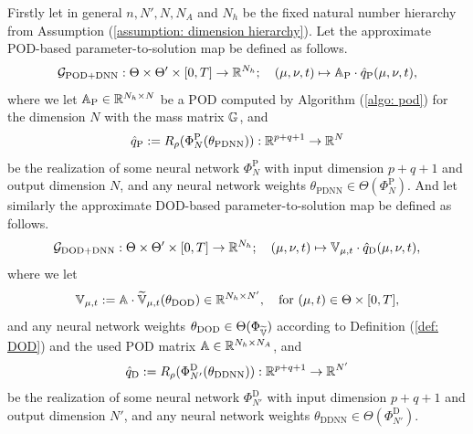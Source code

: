 Firstly let in general $n, N', N, N_A$ and $N_h$ be the fixed natural number hierarchy from 
Assumption (\ref{assumption: dimension hierarchy}). 
Let the approximate POD-based parameter-to-solution map be defined as follows.
\begin{equation*}
    \mathcal{G}_\text{POD+DNN}: \Theta \times \Theta' \times [0, T] \to \mathbb{R}^{N_h}; \quad (\mu, \nu, t) \mapsto 
    \mathbb{A}_\text{P} \cdot \hat{q}_\text{P}(\mu, \nu, t),
\end{equation*}
where we let $\mathbb{A}_\text{P} \in \mathbb{R}^{N_h \times N}$ be a POD computed by Algorithm (\ref{algo: pod}) for the dimension $N$ 
with the mass matrix $\mathbb{G}$,
and
\begin{equation*}
    \hat{q}_\text{P} := R_\rho(\Phi^\text{P}_N(\theta_\text{PDNN})) : \mathbb{R}^{p+q+1} \to \mathbb{R}^N
\end{equation*}
be the realization of some neural network $\Phi^\text{P}_N$ with input dimension $p + q + 1$ and output dimension $N$,
and any neural network weights $\theta_\text{PDNN} \in \Theta(\Phi^\text{P}_N)$. And let similarly the approximate
DOD-based parameter-to-solution map be defined as follows.
\begin{equation*}
    \mathcal{G}_\text{DOD+DNN}: \Theta \times \Theta' \times [0, T] \to \mathbb{R}^{N_h}; \quad (\mu, \nu, t) \mapsto 
    \mathbb{V}_{\mu, t} \cdot \hat{q}_\text{D}(\mu, \nu, t),
\end{equation*}
where we let 
\begin{equation*}
    \mathbb{V}_{\mu, t} := \mathbb{A} \cdot \widetilde{\mathbb{V}}_{\mu, t}(\theta_\text{DOD}) \in \mathbb{R}^{N_h \times N'},
    \quad \text{for } (\mu, t) \in \Theta \times [0, T],
\end{equation*}
and any neural network weights $\theta_\text{DOD} \in \Theta(\Phi_{\widetilde{\mathbb{V}}})$ according to Definition 
(\ref{def: DOD}) and the used POD matrix $\mathbb{A} \in \mathbb{R}^{N_h \times N_A}$, and
\begin{equation*}
    \hat{q}_\text{D} := R_\rho(\Phi^\text{D}_{N'}(\theta_\text{DDNN})) : \mathbb{R}^{p+q+1} \to \mathbb{R}^{N'}
\end{equation*}
be the realization of some neural network $\Phi^\text{D}_{N'}$ with input dimension $p + q + 1$ and output dimension $N'$,
and any neural network weights $\theta_\text{DDNN} \in \Theta(\Phi^\text{D}_{N'})$.


